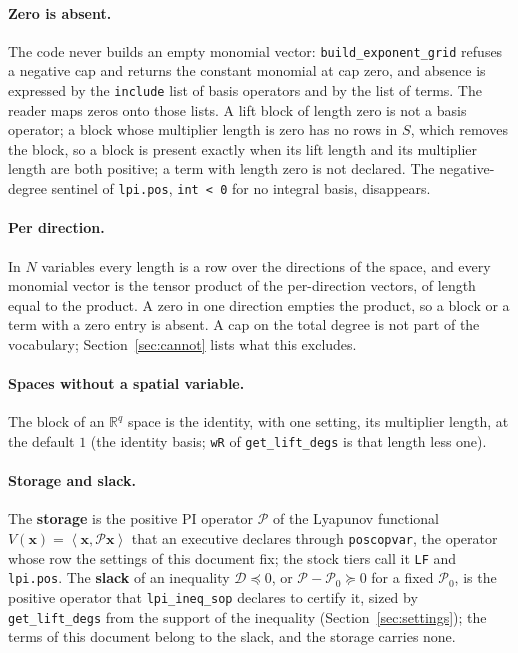 \documentclass[12pt]{article}
\newcommand{\R}{\mathbb{R}}
\newcommand{\mcl}[1]{\mathcal{#1}}
\newcommand{\mbf}[1]{\mathbf{#1}}
\newcommand{\ip}[2]{\left\langle #1,#2\right\rangle}
\newcommand{\code}[1]{\texttt{#1}}
\theoremstyle{plain}
\theoremstyle{definition}
\theoremstyle{remark}
\begin{document}
\paragraph{Zero is absent.} The code never builds an empty monomial vector: \code{build\_exponent\_grid} refuses a negative cap and returns the constant monomial at cap zero, and absence is expressed by the \code{include} list of basis operators and by the list of terms. The reader maps zeros onto those lists. A lift block of length zero is not a basis operator; a block whose multiplier length is zero has no rows in $S$, which removes the block, so a block is present exactly when its lift length and its multiplier length are both positive; a term with length zero is not declared. The negative-degree sentinel of \code{lpi.pos}, \code{int < 0} for no integral basis, disappears.

\paragraph{Per direction.} In $N$ variables every length is a row over the directions of the space, and every monomial vector is the tensor product of the per-direction vectors, of length equal to the product. A zero in one direction empties the product, so a block or a term with a zero entry is absent. A cap on the total degree is not part of the vocabulary; Section~\ref{sec:cannot} lists what this excludes.

\paragraph{Spaces without a spatial variable.} The block of an $\R^q$ space is the identity, with one setting, its multiplier length, at the default $1$ (the identity basis; \code{wR} of \code{get\_lift\_degs} is that length less one).

\paragraph{Storage and slack.} The \textbf{storage} is the positive PI operator $\mcl P$ of the Lyapunov functional $V(\mbf x)=\ip{\mbf x}{\mcl P\mbf x}$ that an executive declares through \code{poscopvar}, the operator whose row the settings of this document fix; the stock tiers call it \code{LF} and \code{lpi.pos}. The \textbf{slack} of an inequality $\mcl D\preceq0$, or $\mcl P-\mcl P_0\succeq0$ for a fixed $\mcl P_0$, is the positive operator that \code{lpi\_ineq\_sop} declares to certify it, sized by \code{get\_lift\_degs} from the support of the inequality (Section~\ref{sec:settings}); the terms of this document belong to the slack, and the storage carries none.
\end{document}
